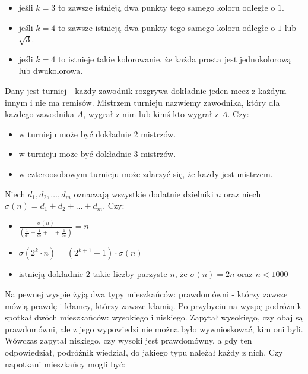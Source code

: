 \documentclass[12pt, a4paper]{article}
\newcommand{\question}[1]{\normalitem \begin{samepage}#1 \end{samepage}}
\newcommand{\questionwithasterix}[1]{ \asterixitem \begin{samepage}#1 \vspace{6cm}\end{samepage}}
\newcommand{\cmark}{\textcolor{green}{T}}%
\newcommand{\xmark}{\textcolor{red}{N}}%
\newcommand{\yes}{\rlap{\framebox(15,15)} {\raisebox{2pt}{\large\hspace{-1pt}\cmark}}%
\hspace{3pt}}
\newcommand{\no}{\rlap{\framebox(15,15)} {\raisebox{2pt}{\large\hspace{-1pt}\xmark}}%
\hspace{3pt}}
\begin{document}
\begin{enumerate}
{		\begin{itemize}
			\item [\yes]jeśli $k = 3$ to zawsze istnieją dwa punkty tego samego koloru odległe o $1$.
			\item [\yes]jeśli $k = 4$ to zawsze istnieją dwa punkty tego samego koloru odległe o $1$ lub $\sqrt{3}$.
			\item [\no]jeśli $k = 4$ to istnieje takie kolorowanie, że każda prosta jest
                jednokolorową lub dwukolorowa.
		\end{itemize}
	}
	
	\question{
	    Dany jest turniej - każdy zawodnik rozgrywa dokładnie jeden mecz z każdym innym
        i nie ma remisów. Mistrzem turnieju nazwiemy zawodnika, który dla każdego zawodnika $A$, wygrał z nim lub kimś kto wygrał z $A$. Czy:

		\begin{itemize}
			\item [\no]w turnieju może być dokładnie 2 mistrzów.
			\item [\yes]w turnieju może być dokładnie 3 mistrzów.
			\item [\no]w czteroosobowym turnieju może zdarzyć się, że każdy jest mistrzem.
		\end{itemize}
	}
	
	\question {
		Niech $d_1, d_2, \ldots, d_m$ oznaczają wszystkie dodatnie dzielniki $n$ oraz niech \\
        $\sigma(n) = d_1 + d_2 + \ldots + d_m$. Czy:

		\begin{itemize}
			\item [\yes]$\frac{\sigma(n)}{(\frac{1}{d_1} + \frac{1}{d_2} + \ldots + \frac{1}{d_m})} = n$
			\item [\no]$\sigma(2^k \cdot n) = (2^{k+1}-1) \cdot \sigma(n)$
			\item [\no]istnieją dokładnie $2$ takie liczby parzyste $n$, że $\sigma(n) = 2n$ oraz $n < 1000$
		\end{itemize}
	}
	
	\questionwithasterix {
        Na pewnej wyspie żyją dwa typy mieszkańców: prawdomówni - którzy zawsze mówią prawdę i kłamcy, którzy zawsze kłamią. Po przybyciu na wyspę podróżnik spotkał dwóch mieszkańców: wysokiego i niskiego. Zapytał wysokiego, czy obaj są prawdomówni, ale z jego wypowiedzi nie można było wywnioskować, kim oni byli. Wówczas zapytał niskiego, czy wysoki jest prawdomówny, a gdy ten odpowiedział, podróżnik wiedział, do jakiego typu należał każdy z nich. Czy napotkani mieszkańcy mogli być:
        
}
\end{enumerate}
\end{document}
